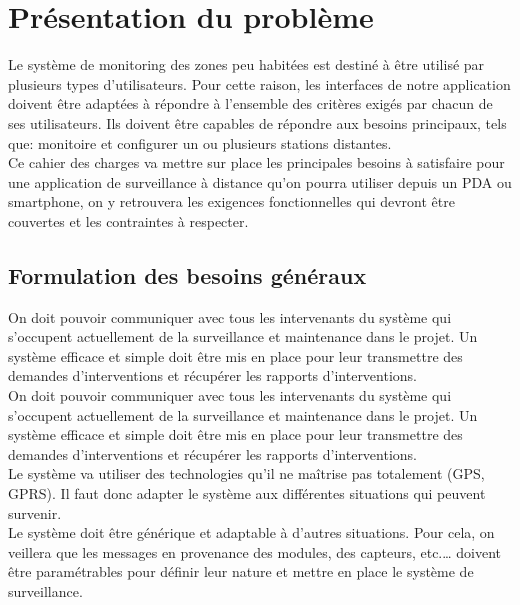 
\section{Présentation du problème}


Le système de monitoring des zones peu habitées est destiné à être utilisé
par plusieurs types d'utilisateurs. Pour cette raison, les interfaces de
notre application doivent être adaptées à répondre à l'ensemble des
critères exigés par chacun de ses utilisateurs. Ils doivent être capables
de répondre aux besoins principaux, tels que: monitoire et configurer un ou
plusieurs stations distantes.\\

Ce cahier des charges va mettre sur place les principales besoins à satisfaire pour une application 
de surveillance à distance qu'on pourra utiliser depuis un PDA ou smartphone, on y retrouvera les exigences 
fonctionnelles qui devront être couvertes et les contraintes à respecter.


\subsection{Formulation des besoins généraux}


On doit pouvoir communiquer avec tous les intervenants du système qui s'occupent actuellement de 
la surveillance et maintenance dans le projet. Un système efficace et simple doit être mis en place 
pour leur transmettre des demandes d'interventions et récupérer les rapports d'interventions.\\

On doit pouvoir communiquer avec tous les intervenants du système qui s'occupent actuellement de la surveillance et maintenance dans le projet. Un système efficace et simple doit être mis en place pour leur transmettre des demandes d'interventions et récupérer les rapports d'interventions.\\


Le système va utiliser des technologies qu'il ne maîtrise pas totalement (GPS, GPRS). Il faut donc 
adapter le système aux différentes situations qui peuvent survenir.\\

Le système doit être générique et adaptable à d'autres situations. Pour cela, on veillera que les 
messages en provenance des modules, des capteurs, etc.… doivent être paramétrables pour définir 
leur nature et mettre en place le système de surveillance.\\

